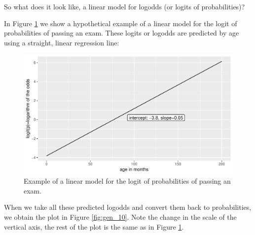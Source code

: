 \documentclass[]{report}\usepackage[]{graphicx}\usepackage[]{color}
\makeatletter
\def\maxwidth{ %
  \ifdim\Gin@nat@width>\linewidth
    \linewidth
  \else
    \Gin@nat@width
  \fi
}
\newenvironment{knitrout}{}{} %
\makeatother
\begin{document}
So what does it look like, a linear model for logodds (or logits of probabilities)?

In Figure \ref{fig:gen_9} we show a hypothetical example of a linear model for the logit of probabilities of passing an exam. These logits or logodds are predicted by age using a straight, linear regression line:


\begin{knitrout}
\color{fgcolor}\begin{figure}

{\centering \includegraphics[width=\maxwidth]{figure/gen_9-1} 

}

\caption[Example of a linear model for the logit of probabilities of passing an exam]{Example of a linear model for the logit of probabilities of passing an exam.}\label{fig:gen_9}
\end{figure}


\end{knitrout}
% 
When we take all these predicted logodds and convert them back to probabilities, we obtain the plot in Figure \ref{fig:gen_10}. Note the change in the scale of the vertical axis, the rest of the plot is the same as in Figure \ref{fig:gen_9}.
\end{document}
